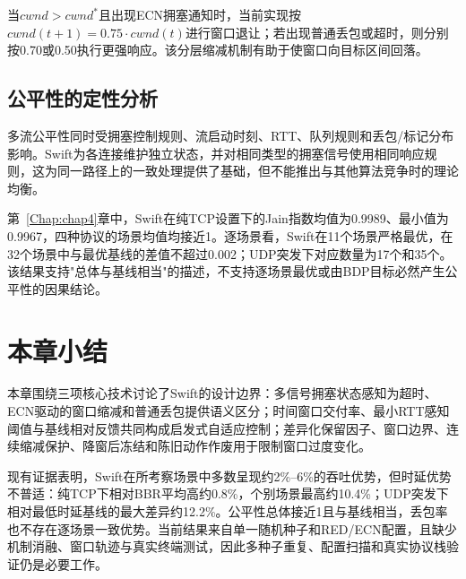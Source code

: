 当$cwnd > cwnd^*$且出现ECN拥塞通知时，当前实现按$cwnd(t+1) = 0.75 \cdot cwnd(t)$进行窗口退让；若出现普通丢包或超时，则分别按0.70或0.50执行更强响应。该分层缩减机制有助于使窗口向目标区间回落。

\subsection{公平性的定性分析}

多流公平性同时受拥塞控制规则、流启动时刻、RTT、队列规则和丢包/标记分布影响。Swift为各连接维护独立状态，并对相同类型的拥塞信号使用相同响应规则，这为同一路径上的一致处理提供了基础，但不能推出与其他算法竞争时的理论均衡。

第~\ref{Chap:chap4}章中，Swift在纯TCP设置下的Jain指数均值为0.9989、最小值为0.9967，四种协议的场景均值均接近1。逐场景看，Swift在11个场景严格最优，在32个场景中与最优基线的差值不超过0.002；UDP突发下对应数量为17个和35个。该结果支持"总体与基线相当"的描述，不支持逐场景最优或由BDP目标必然产生公平性的因果结论。

\section{本章小结}

本章围绕三项核心技术讨论了Swift的设计边界：多信号拥塞状态感知为超时、ECN驱动的窗口缩减和普通丢包提供语义区分；时间窗口交付率、最小RTT感知阈值与基线相对反馈共同构成启发式自适应控制；差异化保留因子、窗口边界、连续缩减保护、降窗后冻结和陈旧动作作废用于限制窗口过度变化。

现有证据表明，Swift在所考察场景中多数呈现约2\%--6\%的吞吐优势，但时延优势不普适：纯TCP下相对BBR平均高约0.8\%，个别场景最高约10.4\%；UDP突发下相对最低时延基线的最大差异约12.2\%。公平性总体接近1且与基线相当，丢包率也不存在逐场景一致优势。当前结果来自单一随机种子和RED/ECN配置，且缺少机制消融、窗口轨迹与真实终端测试，因此多种子重复、配置扫描和真实协议栈验证仍是必要工作。
